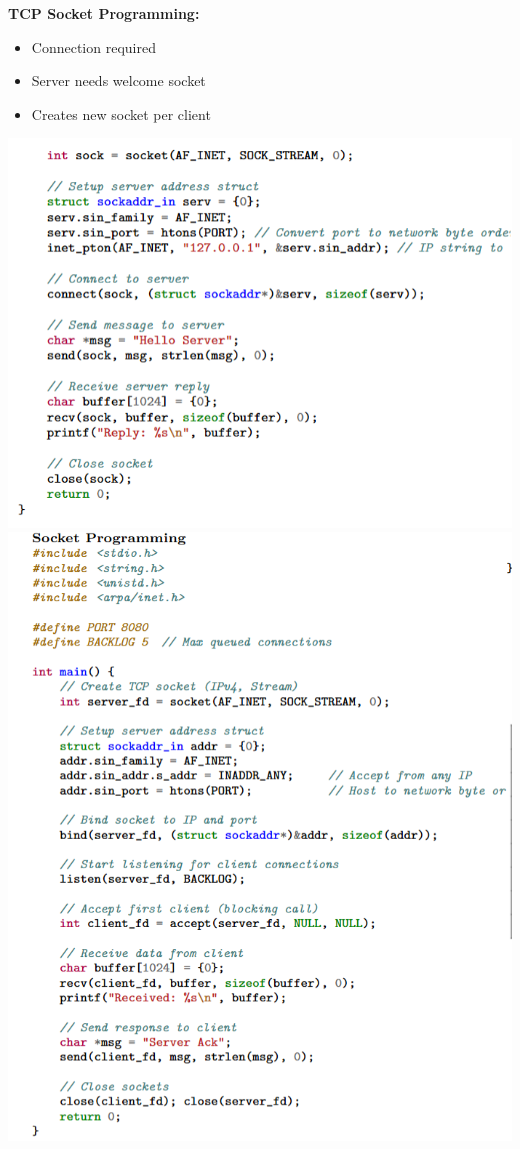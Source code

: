 \documentclass[letterpaper, 8pt]{extarticle}
\begin{document}
\begin{multicols*}{4}
	\textbf{TCP Socket Programming:}
	\begin{itemize}
		\item Connection required
		\item Server needs welcome socket
		\item Creates new socket per client
	\end{itemize}
	\includegraphics[width=\linewidth]{3F6D5B99-7169-4767-998E-64A6C1CBA9DE.png}
	\includegraphics[width=\linewidth]{0425AF17-A743-4266-9F7D-50D8C3335FD6.png}

\end{multicols*}
\end{document}
